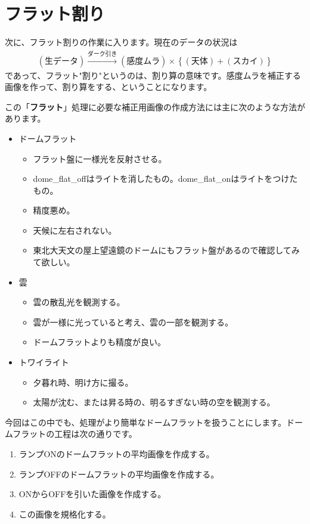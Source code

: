 \section{フラット割り}
\label{sec_3_4}
次に、フラット割りの作業に入ります。現在のデータの状況は
\begin{align*}
  (\text{生データ}) \xrightarrow{\text{ダーク引き}} (感度ムラ)\times\left\{ (天体) + (スカイ) \right\}
\end{align*}
であって、フラット"割り"というのは、割り算の意味です。感度ムラを補正する画像を作って、割り算をする、ということになります。

この「\textbf{フラット}」処理に必要な補正用画像の作成方法には主に次のような方法があります。
\begin{itemize}
  \item ドームフラット
  \begin{itemize}
    \item フラット盤に一様光を反射させる。
    \item dome\_flat\_offはライトを消したもの。dome\_flat\_onはライトをつけたもの。
    \item 精度悪め。
    \item 天候に左右されない。
    \item 東北大天文の屋上望遠鏡のドームにもフラット盤があるので確認してみて欲しい。
  \end{itemize}
  \item 雲
  \begin{itemize}
    \item 雲の散乱光を観測する。
    \item 雲が一様に光っていると考え、雲の一部を観測する。
    \item ドームフラットよりも精度が良い。
  \end{itemize}
  \item トワイライト
  \begin{itemize}
    \item 夕暮れ時、明け方に撮る。
    \item 太陽が沈む、または昇る時の、明るすぎない時の空を観測する。
  \end{itemize}
\end{itemize}

今回はこの中でも、処理がより簡単なドームフラットを扱うことにします。ドームフラットの工程は次の通りです。
\begin{enumerate}[(1)]
  \item ランプONのドームフラットの平均画像を作成する。
  \item ランプOFFのドームフラットの平均画像を作成する。
  \item ONからOFFを引いた画像を作成する。
  \item この画像を規格化する。
\end{enumerate}

